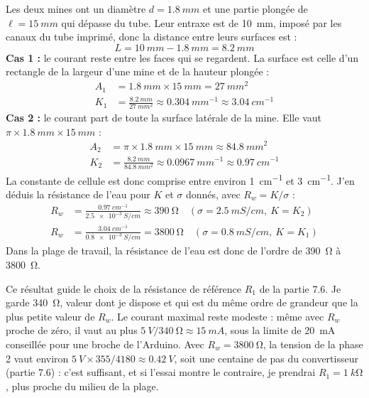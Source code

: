 \begin{exemple}
Les deux mines ont un diamètre $d = \qty{1,8}{mm}$ et une partie plongée de $\ell = \qty{15}{mm}$ qui dépasse du tube. Leur entraxe est de \qty{10}{mm}, imposé par les canaux du tube imprimé, donc la distance entre leurs surfaces est :
\[
L = \qty{10}{mm} - \qty{1,8}{mm} = \qty{8,2}{mm}
\]
\textbf{Cas 1 :} le courant reste entre les faces qui se regardent. La surface est celle d'un rectangle de la largeur d'une mine et de la hauteur plongée :
\begin{align*}
A_1 &= \qty{1,8}{mm}\times\qty{15}{mm} = \qty{27}{mm^2}\\
K_1 &= \frac{\qty{8,2}{mm}}{\qty{27}{mm^2}} \approx \qty{0,304}{mm^{-1}} \approx \qty{3,04}{cm^{-1}}
\end{align*}
\textbf{Cas 2 :} le courant part de toute la surface latérale de la mine. Elle vaut $\pi\times\qty{1,8}{mm}\times\qty{15}{mm}$ :
\begin{align*}
A_2 &= \pi\times\qty{1,8}{mm}\times\qty{15}{mm} \approx \qty{84,8}{mm^2}\\
K_2 &= \frac{\qty{8,2}{mm}}{\qty{84,8}{mm^2}} \approx \qty{0,0967}{mm^{-1}} \approx \qty{0,97}{cm^{-1}}
\end{align*}
La constante de cellule est donc comprise entre environ \qty{1}{cm^{-1}} et \qty{3}{cm^{-1}}. J'en déduis la résistance de l'eau pour $K$ et $\sigma$ donnés, avec $R_w = K/\sigma$ :
\begin{align*}
R_w &= \frac{\qty{0,97}{cm^{-1}}}{\qty{2,5e-3}{S/cm}} \approx \qty{390}{\ohm}\quad(\sigma = \qty{2,5}{mS/cm},\ K = K_2)\\
R_w &= \frac{\qty{3,04}{cm^{-1}}}{\qty{0,8e-3}{S/cm}} = \qty{3800}{\ohm}\quad(\sigma = \qty{0,8}{mS/cm},\ K = K_1)
\end{align*}
Dans la plage de travail, la résistance de l'eau est donc de l'ordre de \qty{390}{\ohm} à \qty{3800}{\ohm}.
\end{exemple}

Ce résultat guide le choix de la résistance de référence $R_1$ de la partie 7.6. Je garde \qty{340}{\ohm}, valeur dont je dispose et qui est du même ordre de grandeur que la plus petite valeur de $R_w$. Le courant maximal reste modeste : même avec $R_w$ proche de zéro, il vaut au plus $\qty{5}{V}/\qty{340}{\ohm} \approx \qty{15}{mA}$, sous la limite de \qty{20}{mA} conseillée pour une broche de l'Arduino. Avec $R_w = \qty{3800}{\ohm}$, la tension de la phase 2 vaut environ $\qty{5}{V}\times 355/4180 \approx \qty{0,42}{V}$, soit une centaine de pas du convertisseur (partie 7.6) : c'est suffisant, et si l'essai montre le contraire, je prendrai $R_1 = \qty{1}{k\ohm}$, plus proche du milieu de la plage.


